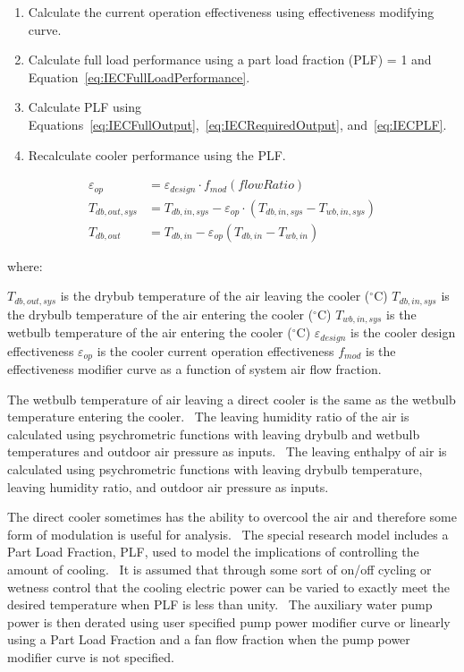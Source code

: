 \begin{enumerate}
\item Calculate the current operation effectiveness using effectiveness modifying curve.
\item Calculate full load performance using a part load fraction (PLF) = 1 and Equation~\ref{eq:IECFullLoadPerformance}.
\item Calculate PLF using Equations~\ref{eq:IECFullOutput},~\ref{eq:IECRequiredOutput}, and~\ref{eq:IECPLF}.
\item Recalculate cooler performance using the PLF.
\end{enumerate}


\begin{equation}
 \begin{array}{rl}
  \varepsilon_{op} & = \varepsilon_{design}\cdot f_{mod}\left(flowRatio\right) \\
  T_{db,out,sys} & = T_{db,in,sys} - \varepsilon_{op}\cdot\left(T_{db,in,sys}-T_{wb,in,sys}\right) \\
  T_{db,out} & = T_{db,in}-\varepsilon_{op}\left(T_{db,in}-T_{wb,in}\right)
 \end{array}
\label{eq:IECFullLoadPerformance}
\end{equation}

where:

\({T_{db,out,sys}}\) is the drybub temperature of the air leaving the cooler (\(^{\circ}\)C)
\({T_{db,in,sys}}\) is the drybulb temperature of the air entering the cooler (\(^{\circ}\)C)
\({T_{wb,in,sys}}\) is the wetbulb temperature of the air entering the cooler (\(^{\circ}\)C)
\(\varepsilon_{design}\) is the cooler design effectiveness
\(\varepsilon_{op}\) is the cooler current operation effectiveness
\(f_{mod}\) is the effectiveness modifier curve as a function of system air flow fraction.

The wetbulb temperature of air leaving a direct cooler is the same as the wetbulb temperature entering the cooler.~ The leaving humidity ratio of the air is calculated using psychrometric functions with leaving drybulb and wetbulb temperatures and outdoor air pressure as inputs.~ The leaving enthalpy of air is calculated using psychrometric functions with leaving drybulb temperature, leaving humidity ratio, and outdoor air pressure as inputs.

The direct cooler sometimes has the ability to overcool the air and therefore some form of modulation is useful for analysis.~ The special research model includes a Part Load Fraction, PLF, used to model the implications of controlling the amount of cooling.~ It is assumed that through some sort of on/off cycling or wetness control that the cooling electric power can be varied to exactly meet the desired temperature when PLF is less than unity.~ The auxiliary water pump power is then derated using user specified pump power modifier curve or linearly using a Part Load Fraction and a fan flow fraction when the pump power modifier curve is not specified.

